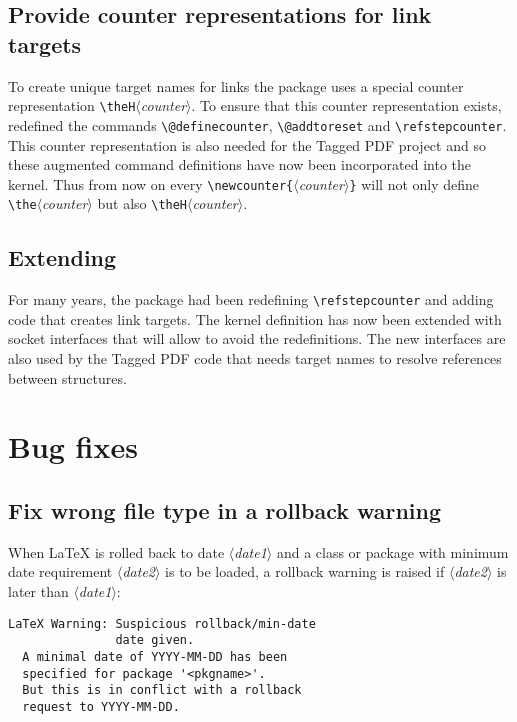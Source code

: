 \documentclass{ltnews}
\providecommand\meta[1]{$\langle$\textrm{\itshape#1}$\rangle$}
\begin{document}
\subsection{Provide counter representations for link targets}

To create unique target names for links the package 
uses a special counter representation \verb+\theH+\meta{counter}. To
ensure that this counter representation exists, 
redefined the commands \verb+\@definecounter+, \verb+\@addtoreset+ and
\verb+\refstepcounter+. This counter representation is also needed for
the Tagged PDF project and so these augmented command definitions
have now been incorporated into the kernel.  Thus from now on every
\verb+\newcounter{+\meta{counter}\verb+}+ will not only define
\verb+\the+\meta{counter} but also \verb+\theH+\meta{counter}.

\subsection{Extending }

For many years, the package  had been redefining
\verb+\refstepcounter+ and adding code that creates link targets.  The
kernel definition has now been extended with socket interfaces that
will allow  to avoid the redefinitions. The new
interfaces are also used by the Tagged PDF code that needs target
names to resolve references between structures.


\section{Bug fixes}

\subsection{Fix wrong file type in a rollback warning}

When \LaTeX{} is rolled back to date \meta{date1} and a class or
package with minimum date requirement \meta{date2} is to be loaded, a
rollback warning is raised if \meta{date2} is later than \meta{date1}:
\begin{verbatim}
LaTeX Warning: Suspicious rollback/min-date
               date given.
  A minimal date of YYYY-MM-DD has been
  specified for package '<pkgname>'.
  But this is in conflict with a rollback
  request to YYYY-MM-DD.
\end{verbatim}
\end{document}
